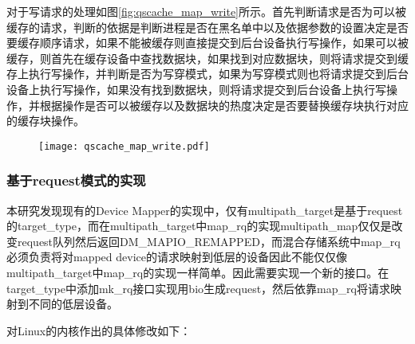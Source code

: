 对于写请求的处理如图\ref{fig:qscache_map_write}所示。首先判断请求是否为可以被缓存的请求，判断的依据是判断进程是否在黑名单中以及依据参数的设置决定是否要缓存顺序请求，如果不能被缓存则直接提交到后台设备执行写操作，如果可以被缓存，则首先在缓存设备中查找数据块，如果找到对应数据块，则将请求提交到缓存上执行写操作，并判断是否为写穿模式，如果为写穿模式则也将请求提交到后台设备上执行写操作，如果没有找到数据块，则将请求提交到后台设备上执行写操作，并根据操作是否可以被缓存以及数据块的热度决定是否要替换缓存块执行对应的缓存块操作。

\begin{figure}[H]
    \centering
    \texttt{[image: qscache\_map\_write.pdf]}
\end{figure}

\subsubsection{基于request模式的实现}

本研究发现现有的Device Mapper的实现中，仅有multipath\_target是基于request的target\_type，而在multipath\_target中map\_rq的实现multipath\_map仅仅是改变request队列然后返回DM\_MAPIO\_REMAPPED，而混合存储系统中map\_rq必须负责将对mapped device的请求映射到低层的设备因此不能仅仅像multipath\_target中map\_rq的实现一样简单。因此需要实现一个新的接口。在target\_type中添加mk\_rq接口实现用bio生成request，然后依靠map\_rq将请求映射到不同的低层设备。

对Linux的内核作出的具体修改如下：

